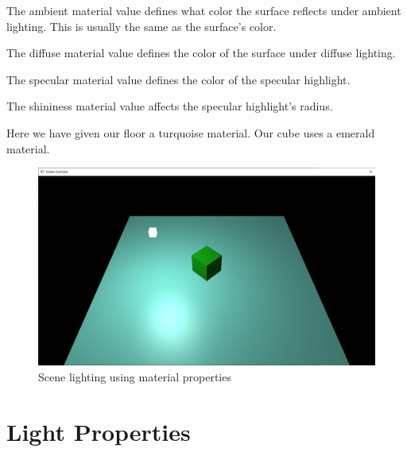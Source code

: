 The ambient material value defines what color the surface reflects under ambient
lighting.
This is usually the same as the surface's color.

The diffuse material value defines the color of the surface under diffuse lighting.

The specular material value defines the color of the specular highlight.

The shininess material value affects the specular highlight's radius.

Here we have given our floor a turquoise material.
Our cube uses a emerald material.

\begin{minipage}{\linewidth}{\noindent}
    
\end{minipage}

\begin{minipage}{\linewidth}{\noindent}
    
\end{minipage}

\begin{figure}[ht]
    \centering
    \includegraphics[scale=0.25]{images/ChBlinnPhong/SceneMaterials.png}
    \caption{Scene lighting using material properties}
    \label{fig::SceneMaterials}
\end{figure}

\section{Light Properties}

